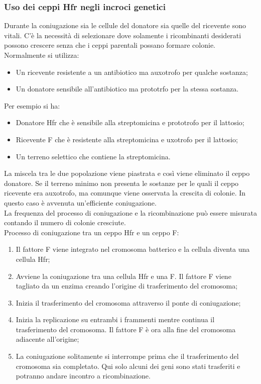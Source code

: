 \subsubsection{Uso dei ceppi Hfr negli incroci genetici}
Durante la coniugazione sia le cellule del donatore sia quelle del ricevente sono vitali. C'è la necessità di selezionare dove solamente i ricombinanti desiderati possono crescere senza che i ceppi parentali possano formare colonie. Normalmente si utilizza:
\begin{itemize}
    \item Un ricevente resistente a un antibiotico ma auxotrofo per qualche sostanza; 
    \item Un donatore sensibile all'antibiotico ma prototrfo per la stessa sostanza. 
\end{itemize}
Per esempio si ha:
\begin{itemize}
    \item Donatore Hfr che è sensibile alla streptomicina e prototrofo per il lattosio; 
    \item Ricevente F\ap{-} che è resistente alla streptomicina e uxotrofo per il lattosio; 
    \item Un terreno selettico che contiene la streptomicina. 
\end{itemize}
La miscela tra le due popolazione viene piastrata e così viene eliminato il ceppo donatore. Se il terreno minimo non presenta le sostanze per le quali il ceppo ricevente era auxotrofo, ma comunque viene osservata la crescita di colonie. In questo caso è avvenuta un'efficiente coniugazione. 
\\La frequenza del processo di coniugazione e la ricombinazione può essere misurata contando il numero di colonie cresciute. 
\\Processo di coniugazione tra un ceppo Hfr e un ceppo F\ap{-}:
\begin{enumerate}
    \item Il fattore F viene integrato nel cromosoma batterico e la cellula diventa una cellula Hfr; 
    \item Avviene la coniugazione tra una cellula Hfr e una F\ap{-}. Il fattore F viene tagliato da un enzima creando l'origine di trasferimento del cromosoma; 
    \item Inizia il trasferimento del cromosoma attraverso il ponte di coniugazione; 
    \item Inizia la replicazione su entrambi i frammenti mentre continua il trasferimento del cromosoma. Il fattore F è ora alla fine del cromosoma adiacente all'origine; 
    \item La coniugazione solitamente si interrompe prima che il trasferimento del cromosoma sia completato. Qui solo alcuni dei geni sono stati trasferiti e potranno andare incontro a ricombinazione. 
\end{enumerate}
